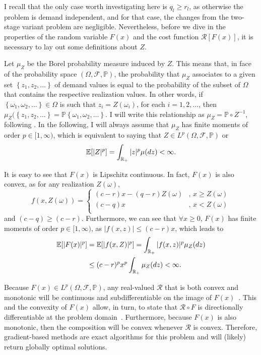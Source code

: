 \documentclass[12pt]{article}
\begin{document}
I recall that the only case worth investigating here is $q_l \ge r_l$, as otherwise the problem is demand independent, and for that case, the changes from the two-stage variant problem are negligible.
Nevertheless, before we dive in the properties of the random variable $F(x)$ and the cost function $\mathcal{R}[F(x)]$, it is necessary to lay out some definitions about $Z$.

Let $\mu_Z$ be the Borel probability measure induced by $Z$.
This means that, in face of the probability space $\left( \Omega,\mathcal{F},\mathbb{P} \right)$, the probability that $\mu_Z$ associates to a given set $\left\{ z_1,z_2,\ldots \right\} $ of demand values is equal to the probability of the subset of $\Omega$ that contains the respective realization values. 
In other words, if $\left\{ \omega_1,\omega_2,\ldots \right\}\in \Omega$ is such that $z_i=Z(\omega_i)$, for each $i=1,2,\ldots$, then $\mu_Z(\left\{ z_1,z_2,\ldots \right\} = \mathbb{P}\left\{ \omega_1,\omega_2,\ldots \right\}$.
I will write this relationship as $\mu_Z = \mathbb{P} \circ Z^{-1}$, following \citet{burtscheidtBilevelLinearOptimization2020}.
In the following, I will always assume that $\mu_Z$ has finite moments of order $p\in [1,\infty)$, which is equivalent to saying that $Z \in L^{p}\left( \Omega, \mathcal{F},\mathbb{P} \right)$ or \[
    \mathbb{E}[|Z|^{p}] = \int_{\mathbb{R}_{+}} |z|^{p} \mu(dz) < \infty
.\]

It is easy to see that $F(x)$ is Lipschitz continuous.
In fact, $F(x)$ is also convex, as for any realization $Z(\omega)$, \[
    f(x,Z(\omega)) = \begin{cases}
	(c-r)x - (q-r)Z(\omega) &,\, x \ge Z(\omega) \\
	(c-q)x &,\, x < Z(\omega) \\
    \end{cases}
\] and $(c-q) \ge (c-r)$.
Furthermore, we can see that $\forall x\ge 0$, $F(x)$ has finite moments of order $p\in [1,\infty)$, as $|f(x,z)| \le (c-r)x$, which leads to
\begin{align*}
    \mathbb{E}[|F(x)|^{p}] &= \mathbb{E}[|f(x,Z)|^{p}] = \int_{\mathbb{R}_{+}} |f(x,z)|^{p} \mu_Z(dz) \\
    &\le  (c-r)^{p} x^{p} \int_{\mathbb{R}_{+}} \mu_Z(dz) < \infty
.\end{align*}

Because $F(x)\in L^{p}\left( \Omega, \mathcal{F},\mathbb{P} \right)$, any real-valued $\mathcal{R}$ that is both convex and monotonic will be continuous and subdifferentiable on the image of $F(x)$~\citep[Proposition~6.5]{shapiroLecturesStochasticProgramming2009}.
This and the convexity of $F(x)$ allow, in turn, to state that $\mathcal{R}\circ F$ is directionally differentiable at the problem domain~\citet[Theorem~6.10]{shapiroLecturesStochasticProgramming2009}.
Furthermore, because $F(x)$ is also monotonic, then the composition will be convex whenever $\mathcal{R}$ is convex.
Therefore, gradient-based methods are exact algorithms for this problem and will (likely) return globally optimal solutions.
\end{document}
